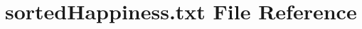 \hypertarget{sortedHappiness_8txt}{}\section{sorted\+Happiness.\+txt File Reference}
\label{sortedHappiness_8txt}
